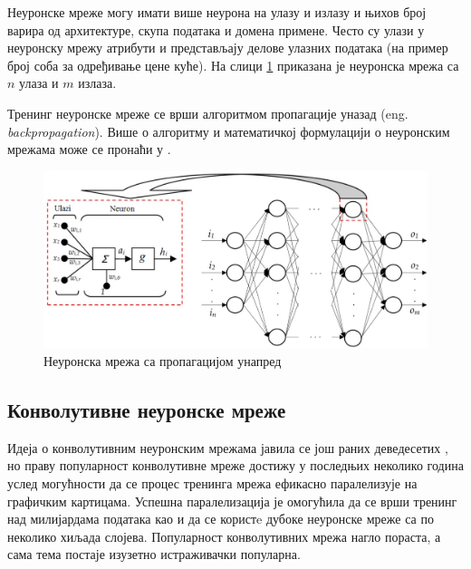 \documentclass[a4paper]{article}
\begin{document}
Неуронске мреже могу имати више неурона на улазу и излазу и њихов број варира од архитектуре, скупа података и домена примене.
Често су улази у неуронску мрежу атрибути и представљају
делове улазних података (на пример број соба за одређивање цене куће).
На слици \ref{fig:nnet} приказана је неуронска мрежа са $n$ улаза и $m$ излаза.

Тренинг неуронске мреже се врши алгоритмом пропагације уназад (eng. \textit{backpropagation}). Више о алгоритму
и математичкој формулацији о неуронским мрежама може се пронаћи у \cite{bishop, statisticalLearning, murphy}.

\begin{figure}[h!]
\begin{center}
    \includegraphics[width=\textwidth]{./resources/neuralnet.png}
\end{center}
\caption{Неуронска мрежа са пропагацијом унапред}
\label{fig:nnet}
\end{figure}

\subsection{Конволутивне неуронске мреже}
Идеја о конволутивним неуронским мрежама јавила се још раних деведесетих \cite{covnetBirth},
но праву популарност конволутивне мреже достижу у последњих неколико година услед могућности
да се процес тренинга мрежа ефикасно паралелизује на графичким картицама. Успешна паралелизација
је омогућила да се врши тренинг над милијардама података као и да се користe дубоке неуронске мреже
са по неколико хиљада слојева. Популарност конволутивних мрежа нагло пораста, а сама тема постаје
изузетно истраживачки популарна.
\end{document}

